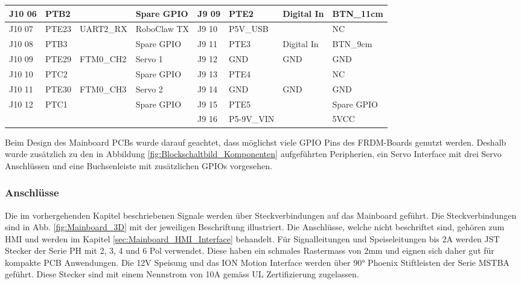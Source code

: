 \begin{table}[H]
\begin{tabular}{|r|r|r|r|l|l|r|l|}
		\hline
		\multicolumn{1}{|l|}{J10 06} & \multicolumn{1}{l|}{PTB2 } &       & \multicolumn{1}{l|}{Spare GPIO} & J9 09 & PTE2  & \multicolumn{1}{l|}{Digital In} & BTN\_11cm \\
		\hline
		\multicolumn{1}{|l|}{J10 07} & \multicolumn{1}{l|}{PTE23} & \multicolumn{1}{l|}{UART2\_RX} & \multicolumn{1}{l|}{RoboClaw TX} & J9 10 & P5V\_USB &       & NC \\
		\hline
		\multicolumn{1}{|l|}{J10 08} & \multicolumn{1}{l|}{PTB3 } &       & \multicolumn{1}{l|}{Spare GPIO} & J9 11 & PTE3  & \multicolumn{1}{l|}{Digital In} & BTN\_9cm \\
		\hline
		\multicolumn{1}{|l|}{J10 09} & \multicolumn{1}{l|}{PTE29} & \multicolumn{1}{l|}{FTM0\_CH2} & \multicolumn{1}{l|}{Servo 1} & J9 12 & GND   & \multicolumn{1}{l|}{GND} & GND \\
		\hline
		\multicolumn{1}{|l|}{J10 10} & \multicolumn{1}{l|}{PTC2} &       & \multicolumn{1}{l|}{Spare GPIO} & J9 13 & PTE4  &       & NC \\
		\hline
		\multicolumn{1}{|l|}{J10 11} & \multicolumn{1}{l|}{PTE30} & \multicolumn{1}{l|}{FTM0\_CH3} & \multicolumn{1}{l|}{Servo 2} & J9 14 & GND   & \multicolumn{1}{l|}{GND} & GND \\
		\hline
		\multicolumn{1}{|l|}{J10 12} & \multicolumn{1}{l|}{PTC1} &       & \multicolumn{1}{l|}{Spare GPIO} & J9 15 & PTE5  &       & Spare GPIO \\
		\hline
		&       &       &       & J9 16 & P5-9V\_VIN &       & 5VCC \\
		\hline
	\end{tabular}%
	\label{tab:FRDM_Port_Mapping}%
\end{table}%

Beim Design des Mainboard PCBs wurde darauf geachtet, dass möglichst viele GPIO Pins des FRDM-Boards genutzt werden. Deshalb wurde zusätzlich zu den in Abbildung \ref{fig:Blockschaltbild_Komponenten} aufgeführten Peripherien, ein Servo Interface mit drei Servo Anschlüssen und eine Buchsenleiste mit zusätzlichen GPIOs vorgesehen.

\subsubsection{Anschlüsse}
Die im vorhergehenden Kapitel beschriebenen Signale werden über Steckverbindungen auf das Mainboard geführt. Die Steckverbindungen sind in Abb. \ref{fig:Mainboard_3D} mit der jeweiligen Beschriftung illustriert. Die Anschlüsse, welche nicht beschriftet sind, gehören zum HMI und werden im Kapitel \ref{sec:Mainboard_HMI_Interface} behandelt. Für Signalleitungen und Speiseleitungen bis 2A werden JST Stecker der Serie PH mit 2, 3, 4 und 6 Pol verwendet. Diese haben ein schmales Rastermass von 2mm und eignen sich daher gut für kompakte PCB Anwendungen. Die 12V Speisung und das ION Motion Interface werden über 90° Phoenix Stiftleisten der Serie MSTBA geführt. Diese Stecker sind mit einem Nennstrom von 10A gemäss UL Zertifizierung zugelassen.

